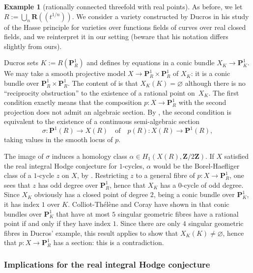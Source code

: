 \documentclass[JEP,XML,SOM,Unicode]{cedram}
\newcommand{\lpr}{(\!(}
\newcommand{\rpr}{)\!)}
\theoremstyle{plain}
\theoremstyle{definition}
\newtheorem{example}[thm]{Example}
\numberwithin{equation}{section}
\renewcommand{\P}{{\mathbf P}}
\newcommand{\R}{{\mathbf R}}
\newcommand{\Z}{{\mathbf Z}}
\renewcommand{\emptyset}{\varnothing}
\begin{document}
\begin{example}[rationally connected threefold with real points]
\label{ex:cexRC}
As before, we let $R:=\bigcup_n\R\lpr t^{1/n}\rpr$.
We consider a variety constructed by Ducros \cite[\S 8]{ducros} in his study of the Hasse principle for varieties over functions fields of curves over real closed fields, and we reinterpret it in our setting (beware that his notation differs slightly from ours).

Ducros sets $K:=R(\P^1_R)$ and defines by equations in \cite[Prop.\,8.11]{ducros} a conic bundle $X_K\to \P^1_K$. We may take a smooth projective model $X\to \P^1_R\times\P^1_R$ of $X_K$: it is a conic bundle over $\P^1_R\times\P^1_R$. The content of \cite[Prop.\,8.11]{ducros} is that $X_K(K)=\emptyset$ although there is no ``reciprocity obstruction'' to the existence of a rational point on~$X_K$. The first condition exactly means that the composition $p:X\to\P^1_R$ with the second projection does not admit an algebraic section. By \cite[Th.\,4.3]{ducros}, the second condition is equivalent to the existence of a continuous semi-algebraic section
\[
\sigma:\P^1(R)\to X(R)\quad\text{of}\quad p(R):X(R)\to \P^1(R),
\]
taking values in the smooth locus of $p$.

The image of $\sigma$ induces a homology class $\alpha\in H_1(X(R),\Z/2\Z)$. If $X$ satisfied the real integral Hodge conjecture for $1$-cycles, $\alpha$ would be the Borel-Haefliger class of a $1$-cycle $z$ on $X$, by \cite[Cor.\,\ref*{BW1-cor:IHC pour solides RC ou CY}]{BW1}. Restricting $z$ to a general fibre of $p:X\to \P^1_R$, one sees that $z$ has odd degree over $\P^1_R$, hence that $X_K$ has a $0$-cycle of odd degree. Since $X_K$ obviously has a closed point of degree $2$, being a conic bundle over $\P^1_K$, it has index $1$ over $K$. Colliot-Thélène and Coray have shown in \cite[Cor.\,4 p.\,309]{ctcoray} that conic bundles over $\P^1_K$ that have at most $5$ singular geometric fibres have a rational point if and only if they have index $1$. Since there are only $4$ singular geometric fibres in Ducros' example, this result applies to show that $X_K(K)\neq\emptyset$, hence that $p:X\to\P^1_R$ has a section: this is a contradiction.
\end{example}

\subsubsection{Implications for the real integral Hodge conjecture}
\label{sss:discussion IHCR}
\end{document}
